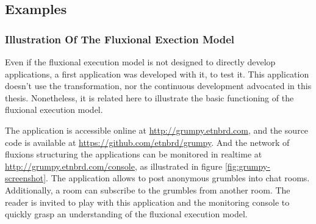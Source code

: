 \subsection{Examples} \label{chapter4:execution-models:examples}

\subsubsection{Illustration Of The Fluxional Exection Model}


Even if the fluxional execution model is not designed to directly develop applications, a first application was developed with it, to test it.
This application doesn't use the transformation, nor the continuous development advocated in this thesis.
Nonetheless, it is related here to illustrate the basic functioning of the fluxional execution model.

The application is accessible online at \url{http://grumpy.etnbrd.com}, and the source code is available at \url{https://github.com/etnbrd/grumpy}.
And the network of fluxions structuring the applications can be monitored in realtime at \url{http://grumpy.etnbrd.com/console}, as illustrated in figure \ref{fig:grumpy-screenshot}.
The application allows to post anonymous grumbles into chat rooms.
Additionally, a room can subscribe to the grumbles from another room.
The reader is invited to play with this application and the monitoring console to quickly grasp an understanding of the fluxional execution model. %

\begin{figure}
\end{figure}


